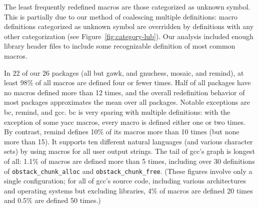 \documentclass[10pt]{article}
\newcommand{\pkg}[1]{\textsf{#1}}
\begin{document}

The least frequently redefined macros are those categorized as unknown
symbol.  This is partially due to our method of coalescing multiple
definitions:  macro definitions categorized as unknown symbol are overridden
by definitions with any other categorization (see
Figure~\ref{fig:category-lub}).  Our
analysis included enough library header files to include some
recognizable definition of most common macros.


In 22 of our 26 packages (all but \pkg{gawk}, and \pkg{gnuchess},
\pkg{mosaic}, and \pkg{remind}), at least 98\% of all macros are defined
four or fewer times.  Half of all packages have no macros defined more than
12 times, and the overall redefinition behavior of most packages
approximates the mean over all packages.  Notable
exceptions are \pkg{bc}, \pkg{remind}, and \pkg{gcc}.  \pkg{bc} is very
sparing with multiple definitions: with the exception of some yacc macros,
every macro is defined either one or two times.  By contrast, \pkg{remind}
defines 10\% of its macros more than 10 times (but none more than 15).  It
supports ten different natural languages (and various character sets) by
using macros for all user output strings.  The tail of \pkg{gcc}'s graph is
longest of all: 1.1\% of macros are defined more than 5 times, including
over 30 definitions of \verb|obstack_chunk_alloc| and
\verb|obstack_chunk_free|.  (These figures involve only a single
configuration; for all of \pkg{gcc}'s source code, including various
architectures and operating systems but excluding libraries, 4\% of macros
are defined 20 times and 0.5\% are defined 50 times.)
\end{document}
